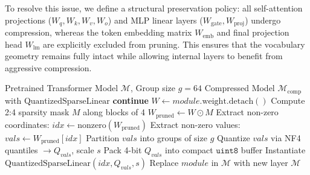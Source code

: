\documentclass[conference]{IEEEtran}
\begin{document}
To resolve this issue, we define a structural preservation policy: all self-attention projections ($W_q, W_k, W_v, W_o$) and MLP linear layers ($W_{\text{gate}}, W_{\text{proj}}$) undergo compression, whereas the token embedding matrix $W_{\text{emb}}$ and final projection head $W_{\text{lm}}$ are explicitly excluded from pruning. This ensures that the vocabulary geometry remains fully intact while allowing internal layers to benefit from aggressive compression.

\begin{algorithm}[t]
\caption{Compound 2:4 Pruning + NF4 Quantization with Vocabulary Head Preservation}
\label{alg:compound}
\begin{algorithmic}[1]
\REQUIRE Pretrained Transformer Model $\mathcal{M}$, Group size $g=64$
\ENSURE Compressed Model $\mathcal{M}_{\text{comp}}$ with $\text{QuantizedSparseLinear}$
        \STATE \textbf{continue} 
    \ENDIF
        \STATE $W \leftarrow module.\text{weight}.\text{detach}()$
        \STATE Compute 2:4 sparsity mask $M$ along blocks of 4
        \STATE $W_{\text{pruned}} \leftarrow W \odot M$
        \STATE Extract non-zero coordinates: $idx \leftarrow \text{nonzero}(W_{\text{pruned}})$
        \STATE Extract non-zero values: $vals \leftarrow W_{\text{pruned}}[idx]$
        \STATE Partition $vals$ into groups of size $g$
        \STATE Quantize $vals$ via NF4 quantiles $\to Q_{vals}$, scale $s$
        \STATE Pack 4-bit $Q_{vals}$ into compact $\texttt{uint8}$ buffer
        \STATE Instantiate $\text{QuantizedSparseLinear}(idx, Q_{vals}, s)$
        \STATE Replace $module$ in $\mathcal{M}$ with new layer
    \ENDIF
\ENDFOR
\RETURN $\mathcal{M}$
\end{algorithmic}
\end{algorithm}
\end{document}
